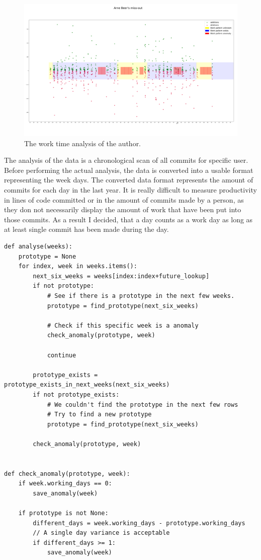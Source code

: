 \begin{figure}[H]
    \includegraphics[scale=0.20]{./graphs/analysis/work-time-analysis}
    \centering
    \caption{The work time analysis of the author.}\label{fig:missing-time}
\end{figure}

The analysis of the data is a chronological scan of all commits for specific user.
Before performing the actual analysis, the data is converted into a usable format representing the week days.
The converted data format represents the amount of commits for each day in the last year.
It is really difficult to measure productivity in lines of code committed or in the amount of commits made by a person, as they don not necessarily display the amount of work that have been put into those commits.
As a result I decided, that a day counts as a work day as long as at least single commit has been made during the day.

\begin{verbatim}
def analyse(weeks):
    prototype = None
    for index, week in weeks.items():
        next_six_weeks = weeks[index:index+future_lookup]
        if not prototype:
            # See if there is a prototype in the next few weeks.
            prototype = find_prototype(next_six_weeks)

            # Check if this specific week is a anomaly
            check_anomaly(prototype, week)

            continue

        prototype_exists = prototype_exists_in_next_weeks(next_six_weeks)
        if not prototype_exists:
            # We couldn't find the prototype in the next few rows
            # Try to find a new prototype
            prototype = find_prototype(next_six_weeks)

        check_anomaly(prototype, week)


def check_anomaly(prototype, week):
    if week.working_days == 0:
        save_anomaly(week)

    if prototype is not None:
        different_days = week.working_days - prototype.working_days
        // A single day variance is acceptable
        if different_days >= 1:
            save_anomaly(week)

\end{verbatim}
\begingroup
{}
\endgroup

